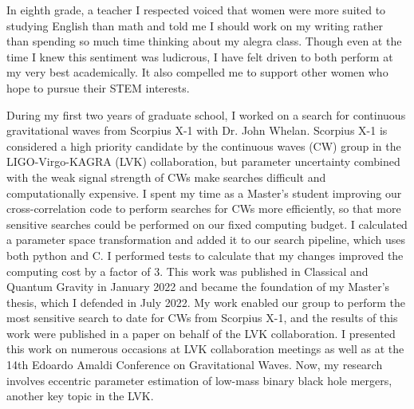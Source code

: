 \documentclass{article}
\begin{document}
In eighth grade, a teacher I respected voiced that women were more suited to studying English than math and told me I should work on my writing rather than spending so much time thinking about my alegra class. Though even at the time I knew this sentiment was ludicrous, I have felt driven to both perform at my very best academically. It also compelled me to support other women who hope to pursue their STEM interests.

During my first two years of graduate school, I worked on a search for continuous gravitational waves from Scorpius X-1 with Dr. John Whelan. Scorpius X-1 is considered a high priority candidate by the continuous waves (CW) group in the LIGO-Virgo-KAGRA (LVK) collaboration, but parameter uncertainty combined with the weak signal strength of CWs make searches difficult and computationally expensive. I spent my time as a Master’s student improving our cross-correlation code to perform searches for CWs more efficiently, so that more sensitive searches could be performed on our fixed computing budget. I calculated a parameter space transformation and added it to our search pipeline, which uses both python and C. I performed tests to calculate that my changes improved the computing cost by a factor of 3. This work was published in Classical and Quantum Gravity in January 2022 and became the foundation of my Master’s thesis, which I defended in July 2022. My work enabled our group to perform the most sensitive search to date for CWs from Scorpius X-1, and the results of this work were published in a paper on behalf of the LVK collaboration. I presented this work on numerous occasions at LVK collaboration meetings as well as at the 14th Edoardo Amaldi Conference on Gravitational Waves. Now, my research involves eccentric parameter estimation of low-mass binary black hole mergers, another key topic in the LVK.
\end{document}
